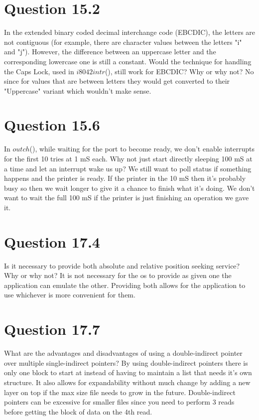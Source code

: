 \documentclass{article}
\begin{document}
\section*{Question 15.2}
In the extended binary coded decimal interchange code (EBCDIC), the letters are not contiguous
(for example, there are character values between the letters "i" and "j").
However, the difference between an uppercase letter and the corresponding lowercase one is still a constant.
Would the technique for handling the Caps Lock, used in $i8042intr$(), still work for EBCDIC?
Why or why not?
\newline
No since for values that are between letters they would get converted to their "Uppercase" variant which wouldn't make sense.

\section*{Question 15.6}
In $outch$(), while waiting for the port to become ready, we don't enable interrupts for the first 10 tries at 1 mS each.
Why not just start directly sleeping 100 mS at a time and let an interrupt wake us up?
\newline
We still want to poll status if something happens and the printer is ready.
If the printer in the 10 mS then it's probably busy so then we wait longer to give it a chance to finish what it's doing.
We don't want to wait the full 100 mS if the printer is just finishing an operation we gave it.

\section*{Question 17.4}
Is it necessary to provide both absolute and relative position seeking service?
Why or why not?
\newline
It is not necessary for the os to provide as given one the application can emulate the other.
Providing both allows for the application to use whichever is more convenient for them.

\section*{Question 17.7}
What are the advantages and disadvantages of using a double-indirect pointer over multiple single-indirect pointers?
\newline
By using double-indirect pointers there is only one block to start at instead of having to maintain a list that needs it's own structure.
It also allows for expandability without much change by adding a new layer on top if the max size file needs to grow in the future.
Double-indirect pointers can be excessive for smaller files since you need to perform 3 reads before getting the block of data on the 4th read.
\end{document}
